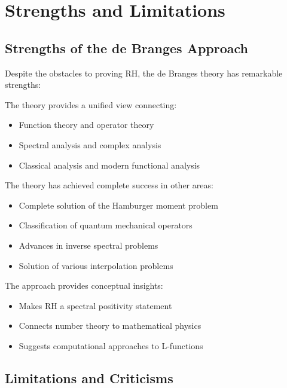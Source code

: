 \section{Strengths and Limitations}
\label{sec:strengths-limitations}

\subsection{Strengths of the de Branges Approach}

Despite the obstacles to proving RH, the de Branges theory has remarkable strengths:

\begin{strength}
The theory provides a unified view connecting:
\begin{itemize}
\item Function theory and operator theory
\item Spectral analysis and complex analysis  
\item Classical analysis and modern functional analysis
\end{itemize}
\end{strength}

\begin{strength}
The theory has achieved complete success in other areas:
\begin{itemize}
\item Complete solution of the Hamburger moment problem
\item Classification of quantum mechanical operators
\item Advances in inverse spectral problems
\item Solution of various interpolation problems
\end{itemize}
\end{strength}

\begin{strength}
The approach provides conceptual insights:
\begin{itemize}
\item Makes RH a spectral positivity statement
\item Connects number theory to mathematical physics
\item Suggests computational approaches to L-functions
\end{itemize}
\end{strength}

\subsection{Limitations and Criticisms}

